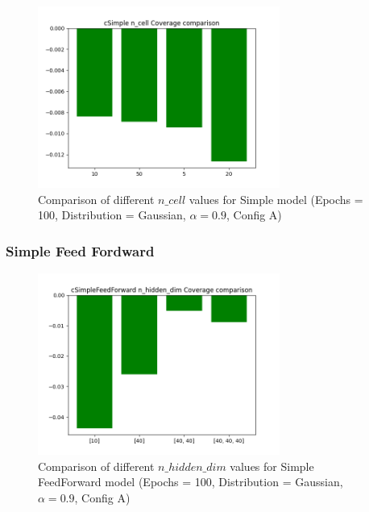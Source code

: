 \begin{figure}[H]
    \centering
    \includegraphics[width=300px]{plots/hist/a/cSimple/n_cell/Coverage.png}
    \caption{Comparison of different $n\_cell$ values for Simple model (Epochs = 100, Distribution = Gaussian, $\alpha = 0.9$, Config A)}
    \label{fig:comp2_simple}
\end{figure}



\subsubsection{Simple Feed Fordward} \label{comp2_feedfordward}

\begin{figure}[H]
    \centering
    \includegraphics[width=300px]{plots/hist/a/cSimpleFeedForward/n_hidden_dim/Coverage.png}
    \caption{Comparison of different $n\_hidden\_dim$ values for Simple FeedForward model (Epochs = 100, Distribution = Gaussian, $\alpha = 0.9$, Config A)}
    \label{fig:comp2_feedfordward}
\end{figure}



